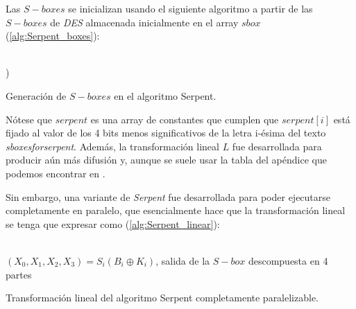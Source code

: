 Las $S-boxes$ se inicializan usando el siguiente algoritmo a partir de las $S-boxes$ de \textit{DES}\cite{DES_Boxes} almacenada inicialmente en el array $sbox$ (\ref{alg:Serpent_boxes}):

\begin{algorithm}[H]
	\begin{algorithmic}[1]
		\REQUIRE \ \\
			
				)
			\ENDFOR
			\ENDIF
		\ENDWHILE
	\end{algorithmic}
	\caption{Generación de $S-boxes$ en el algoritmo Serpent.}
		\label{alg:Serpent_boxes}
\end{algorithm}

Nótese que $serpent$ es una array de constantes que cumplen que $serpent[i]$ está fijado al valor de los 4 bits menos significativos de la letra i-ésima del texto \textit{sboxesforserpent}. Además, la transformación lineal $L$ fue desarrollada para producir aún más difusión y, aunque se suele usar la tabla del apéndice que podemos encontrar en \cite{Serpent_AES}.

Sin embargo, una variante de \textit{Serpent} fue desarrollada para poder ejecutarse completamente en paralelo, que esencialmente hace que la transformación lineal se tenga que expresar como (\ref{alg:Serpent_linear}):
\begin{algorithm}[H]
	\begin{algorithmic}[1]
		\REQUIRE \ \\
			\texttt{$(X_0, X_1, X_2, X_3) = S_i(B_i \oplus K_i)$}, salida de la $S-box$ descompuesta en 4 partes\\
		
	\end{algorithmic}
	\caption{Transformación lineal del algoritmo Serpent completamente paralelizable.}
		\label{alg:Serpent_linear}
\end{algorithm}


